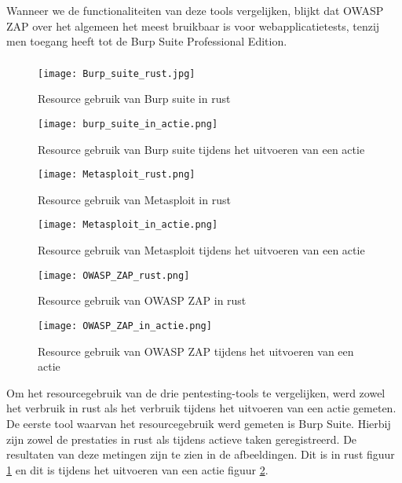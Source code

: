Wanneer we de functionaliteiten van deze tools vergelijken, blijkt dat OWASP ZAP over het algemeen het meest bruikbaar is voor 
webapplicatietests, tenzij men toegang heeft tot de Burp Suite Professional Edition.
\subsubsection{}
\begin{figure}
    \centering
    \texttt{[image: Burp\_suite\_rust.jpg]}
    \caption[Resource gebruik van Burp suite in rust]{Resource gebruik van Burp suite in rust}
    \label{fig:burp_suite_rust}
\end{figure}
\begin{figure}
    \centering
    \texttt{[image: burp\_suite\_in\_actie.png]}
    \caption[Resource gebruik van Burp suite tijdens het uitvoeren van een actie]{Resource gebruik van Burp suite tijdens het uitvoeren van een actie}
    \label{fig:burp_suite_actie}
\end{figure}
\begin{figure}
    \centering
    \texttt{[image: Metasploit\_rust.png]}
    \caption[Resource gebruik van Metasploit in rust]{Resource gebruik van Metasploit in rust}
    \label{fig:metasploit_rust}
\end{figure}
\begin{figure}
    \centering
    \texttt{[image: Metasploit\_in\_actie.png]}
    \caption[Resource gebruik van Metasploit tijdens het uitvoeren van een actie]{Resource gebruik van Metasploit tijdens het uitvoeren van een actie}
    \label{fig:metasploit_actie}
\end{figure}
\begin{figure}
    \centering
    \texttt{[image: OWASP\_ZAP\_rust.png]}
    \caption[Resource gebruik van OWASP ZAP in rust]{Resource gebruik van OWASP ZAP in rust}
    \label{fig:owasp_rust}
\end{figure}
\begin{figure}
    \centering
    \texttt{[image: OWASP\_ZAP\_in\_actie.png]}
    \caption[Resource gebruik van OWASP ZAP tijdens het uitvoeren van een actie]{Resource gebruik van OWASP ZAP tijdens het uitvoeren van een actie}
    \label{fig:owasp_actie}
\end{figure}
Om het resourcegebruik van de drie pentesting-tools te vergelijken, werd zowel het verbruik in rust als het verbruik tijdens het 
uitvoeren van een actie gemeten. De eerste tool waarvan het resourcegebruik werd gemeten is Burp Suite. Hierbij zijn zowel de 
prestaties in rust als tijdens actieve taken geregistreerd. De resultaten van deze metingen zijn te zien in de afbeeldingen. 
Dit is in rust figuur \ref{fig:burp_suite_rust} en dit is tijdens het uitvoeren van een actie figuur \ref{fig:burp_suite_actie}. 

